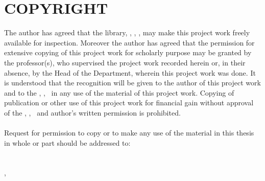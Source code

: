 \section*{COPYRIGHT}
\vspace{0.5cm}

The author has agreed that the library, \thedepartment, \theinstitute, \thecampus, may make this project
work freely available for inspection. Moreover the author has agreed that the
permission for extensive copying of this project work for scholarly purpose may be
granted by the professor(s), who supervised the project work recorded herein or, in
their absence, by the Head of the Department, wherein this project work was done. It
is understood that the recognition will be given to the author of this project work and
to the \thedepartment, \theinstitute, \thecampus \ in any use of the material of this project work. Copying of publication or other use of
this project work for financial gain without approval of the \thedepartment, \theinstitute, \thecampus \ and author’s
written permission is prohibited.\\
\\
Request for permission to copy or to make any use of the material in this thesis in
whole or part should be addressed to:\\
\\
\thedepartment\\
\theinstitute, \thecampus\\
\thedepartmentFullAddress

